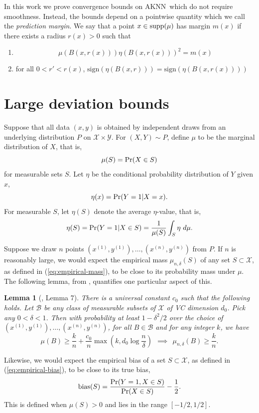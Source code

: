\documentclass{article}
\def\pr{{\rm Pr}}
\def\X{{\mathcal X}}
\def\Y{{\mathcal Y}}
\def\B{{\mathcal B}}
\def\bias{{\rm bias}}
\def\supp{{\rm supp}}
\newcommand{\sign}{\mbox{sign}}
\newcommand{\algname}{\textsc{AKNN}}
\newtheorem{lemma}[theorem]{Lemma}
\begin{document}
In this work we prove convergence bounds on  \algname\ which do not
require smoothness. Instead, the bounds depend on a pointwise quantity
which we call the {\em prediction margin}. We say that a point $x \in \supp(\mu)$
has margin $m(x)$ if there exists a radius $r(x)>0$ such that 
\begin{enumerate}
\item $$ \mu(B(x,r(x))) \eta(B(x,r(x)))^2 = m(x) $$
\item for all $0<r'<r(x)$, $\sign(\eta(B(x,r))) = \sign(\eta(B(x,r(x))))$
\end{enumerate}


\section{Large deviation bounds}

Suppose that all data $(x,y)$ is obtained by independent draws from an underlying distribution $P$ on $\X \times \Y$. For $(X,Y) \sim P$, define $\mu$ to be the marginal distribution of $X$, that is,
$$ \mu(S) = \pr(X \in S) $$
for measurable sets $S$. Let $\eta$ be the conditional probability distribution of $Y$ given $x$,
$$ \eta(x) = \pr(Y = 1| X = x) .$$
For measurable $S$, let $\eta(S)$ denote the average $\eta$-value, that is,
$$ \eta(S) = \pr(Y = 1| X \in S) = \frac{1}{\mu(S)} \int_S \eta \ d \mu .$$

Suppose we draw $n$ points $(x^{(1)}, y^{(1)}), \ldots, (x^{(n)}, y^{(n)})$ from $P$. If $n$ is reasonably large, we would expect the empirical mass $\mu_{n,\delta}(S)$ of any set $S \subset \X$, as defined in (\ref{eq:empirical-mass}), to be close to its probability mass under $\mu$. The following lemma, from \cite{ChaudhuriDasgupta2010}, quantifies one particular aspect of this.
\begin{lemma}[\cite{ChaudhuriDasgupta2010}, Lemma 7]
There is a universal constant $c_0$ such that the following holds. Let $\B$ be any class of measurable subsets of $\X$ of VC dimension $d_0$. Pick any $0 < \delta < 1$. Then with probability at least $1-\delta^2/2$ over the choice of $(x^{(1)}, y^{(1)}), \ldots, (x^{(n)}, y^{(n)})$, for all $B \in \B$ and for any integer $k$, we have
$$ \mu(B) \geq \frac{k}{n} + \frac{c_0}{n} \max \left( k, d_0 \log \frac{n}{\delta} \right)
\ \ \implies \ \ 
\mu_{n,\delta}(B) \geq \frac{k}{n} .$$
\label{lemma:points-in-balls}
\end{lemma}

Likewise, we would expect the empirical bias of a set $S \subset \X$, as defined in (\ref{eq:empirical-bias}), to be close to its true bias,
$$ \bias(S) = \frac{\pr(Y = 1, X \in S)}{\pr(X \in S)} - \frac{1}{2} .$$
This is defined when $\mu(S) > 0$ and lies in the range $[-1/2,1/2]$.
\end{document}
